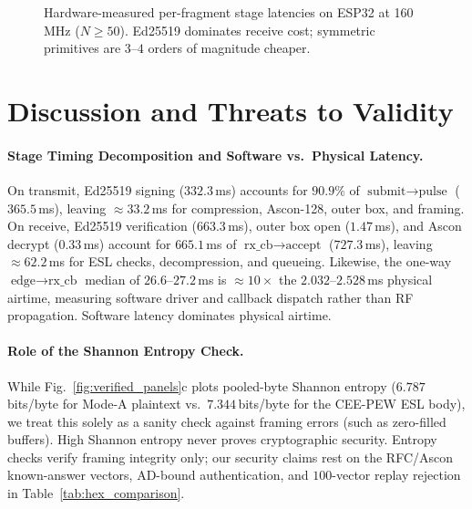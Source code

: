 \documentclass[conference]{IEEEtran}
\begin{document}
\begin{figure}[t]
\centering
{}
\caption{Hardware-measured per-fragment stage latencies on ESP32 at 160\,MHz ($N\ge50$). Ed25519 dominates receive cost; symmetric primitives are $3$--$4$ orders of magnitude cheaper.}
\label{fig:stage_timing}
\end{figure}

\section{Discussion and Threats to Validity}

\paragraph{Stage Timing Decomposition and Software vs.\ Physical Latency.} On transmit, Ed25519 signing ($332.3$\,ms) accounts for $90.9\%$ of $\text{submit}\rightarrow\text{pulse}$ ($365.5$\,ms), leaving $\approx 33.2$\,ms for compression, Ascon-128, outer box, and framing. On receive, Ed25519 verification ($663.3$\,ms), outer box open ($1.47$\,ms), and Ascon decrypt ($0.33$\,ms) account for $665.1$\,ms of $\text{rx\_cb}\rightarrow\text{accept}$ ($727.3$\,ms), leaving $\approx 62.2$\,ms for ESL checks, decompression, and queueing. Likewise, the one-way $\text{edge}\rightarrow\text{rx\_cb}$ median of $26.6$--$27.2$\,ms is $\approx 10\times$ the $2.032$--$2.528$\,ms physical airtime, measuring software driver and callback dispatch rather than RF propagation. Software latency dominates physical airtime.

\paragraph{Role of the Shannon Entropy Check.} While Fig.~\ref{fig:verified_panels}c plots pooled-byte Shannon entropy ($6.787$\,bits/byte for Mode-A plaintext vs.\ $7.344$\,bits/byte for the CEE-PEW ESL body), we treat this solely as a sanity check against framing errors (such as zero-filled buffers). High Shannon entropy never proves cryptographic security. Entropy checks verify framing integrity only; our security claims rest on the RFC/Ascon known-answer vectors, AD-bound authentication, and $100$-vector replay rejection in Table~\ref{tab:hex_comparison}.
\end{document}
